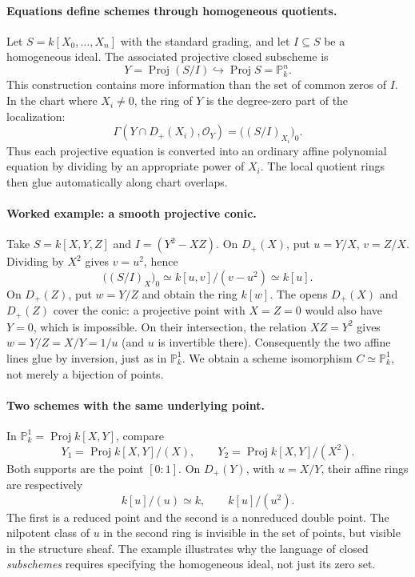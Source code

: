 \paragraph{Equations define schemes through homogeneous quotients.}
Let \(S=k[X_0,\ldots,X_n]\) with the standard grading, and let
\(I\subseteq S\) be a homogeneous ideal.  The associated projective
closed subscheme is
\[
 Y=\operatorname{Proj}(S/I)\hookrightarrow\operatorname{Proj}S
    =\mathbb P_k^n.
\]
This construction contains more information than the set of common
zeros of \(I\).  In the chart where \(X_i\ne0\), the ring of \(Y\)
is the degree-zero part of the localization:
\[
 \Gamma(Y\cap D_+(X_i),\mathcal O_Y)
      =\bigl((S/I)_{X_i}\bigr)_0.
\]
Thus each projective equation is converted into an ordinary affine
polynomial equation by dividing by an appropriate power of \(X_i\).
The local quotient rings then glue automatically along chart overlaps.

\paragraph{Worked example: a smooth projective conic.}
Take \(S=k[X,Y,Z]\) and \(I=(Y^2-XZ)\).
On \(D_+(X)\), put \(u=Y/X\), \(v=Z/X\).
Dividing by \(X^2\) gives \(v=u^2\), hence
\[
 \bigl((S/I)_X\bigr)_0
      \simeq k[u,v]/(v-u^2)\simeq k[u].
\]
On \(D_+(Z)\), put \(w=Y/Z\) and obtain the ring \(k[w]\).
The opens \(D_+(X)\) and \(D_+(Z)\) cover the conic: a projective
point with \(X=Z=0\) would also have \(Y=0\), which is impossible.
On their intersection, the relation \(XZ=Y^2\) gives
\(w=Y/Z=X/Y=1/u\) (and \(u\) is invertible there).
Consequently the two affine lines glue by inversion, just as in
\(\mathbb P_k^1\).  We obtain a scheme isomorphism
\(C\simeq\mathbb P_k^1\), not merely a bijection of points.

\paragraph{Two schemes with the same underlying point.}
In \(\mathbb P_k^1=\operatorname{Proj}k[X,Y]\), compare
\[
 Y_1=\operatorname{Proj}k[X,Y]/(X),\qquad
 Y_2=\operatorname{Proj}k[X,Y]/(X^2).
\]
Both supports are the point \([0:1]\).  On \(D_+(Y)\), with
\(u=X/Y\), their affine rings are respectively
\[
 k[u]/(u)\simeq k,\qquad k[u]/(u^2).
\]
The first is a reduced point and the second is a nonreduced double
point.  The nilpotent class of \(u\) in the second ring is invisible
in the set of points, but visible in the structure sheaf.
The example illustrates why the language of closed \emph{subschemes}
requires specifying the homogeneous ideal, not just its zero set.

